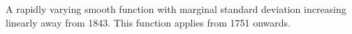 A rapidly varying smooth function with marginal standard deviation increasing linearly away from 1843. This function applies from 1751 onwards.
